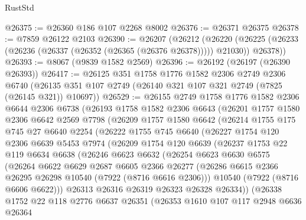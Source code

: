 \begin{lexlean}{RustStd}
\begin{coremodule}
@26375 := @26360 @186 @107 @2268 @8002
@26376 := @26371 @26375
@26378 := @7859 @26122 @2103
@26390 := @26207
    (@26212
      (@26220 (@26225 (@26233 (@26236 (@26337 (@26352 (@26365 (@26376 @26378))))) @21030)) @26378))
@26393 := @8067 (@9839 @1582 @2569)
@26396 := @26192 (@26197 (@26390 @26393))
@26417 := @26125
    @351
    @1758
    @1776
    @1582
    @2306
    @2749
    @2306
    @6740
    (@26135 @351 @107 @2749 (@26140 @321 @107 @321 @2749 (@7825 (@26145 @321)) @10697))
@26529 := @26155
    @2749
    @1758
    @1776
    @1582
    @2306
    @6644
    @2306
    @6738
    (@26193
      @1758
      @1582
      @2306
      @6643
      (@26201
        @1757
        @1580
        @2306
        @6642
        @2569
        @7798
        (@26209
          @1757
          @1580
          @6642
          (@26214
            @1755
            @175
            @745
            @27
            @6640
            @2254
            (@26222
              @1755
              @745
              @6640
              (@26227
                @1754
                @120
                @2306
                @6639
                @5453
                @7974
                (@26209
                  @1754
                  @120
                  @6639
                  (@26237
                    @1753
                    @22
                    @119
                    @6634
                    @6638
                    (@26246
                      @6623
                      @6632
                      (@26254
                        @6623
                        @6630
                        @6575
                        (@26264
                          @6622
                          @6629
                          @2687
                          @6605
                          @2366
                          @26277
                          (@26286 @6615 @2366 @26295 @26298 @10540 (@7922 (@8716 @6616 @2306)))
                          @10540
                          (@7922 (@8716 @6606 @6622)))
                        @26313
                        @26316
                        @26319
                        @26323
                        @26328
                        @26334))
                    (@26338
                      @1752
                      @22
                      @118
                      @2776
                      @6637
                      @26351
                      (@26353
                        @1610
                        @107
                        @117
                        @2948
                        @6636
                        @26364

\end{coremodule}
\end{lexlean}
